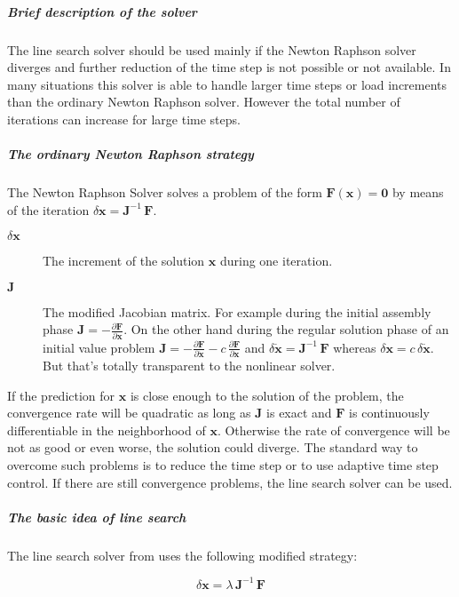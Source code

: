 \subparagraph{Brief description of the solver}
The line search solver should be used mainly if the Newton Raphson solver diverges and further reduction of the time step is not possible or not available. In many situations this solver is able to handle larger time steps or load increments than the ordinary Newton Raphson solver. However the total number of iterations can increase for large time steps.

\subparagraph{The ordinary Newton Raphson strategy}
The Newton Raphson Solver solves a problem of the form $\boldsymbol{F}\left(\boldsymbol{x}\right)=\boldsymbol{0}$ by means of the iteration $\delta\boldsymbol{x}=\boldsymbol{J}^{-1}\,\boldsymbol{F}$.

\begin{description}
\item[$\delta\boldsymbol{x}$] The increment of the solution $\boldsymbol{x}$ during one iteration.
\item[$\boldsymbol{J}$] The modified Jacobian matrix. 
For example during the initial assembly phase $\boldsymbol{J}=-\frac{\partial \boldsymbol{F}}{\partial \boldsymbol{x}}$. 
On the other hand during the regular solution phase of an initial value problem $\boldsymbol{J}=-\frac{\partial \boldsymbol{F}}{\partial \dot{\boldsymbol{x}}}-c\,\frac{\partial \boldsymbol{F}}{\partial \boldsymbol{x}}$
and $\delta\dot{\boldsymbol{x}}=\boldsymbol{J}^{-1}\,\boldsymbol{F}$ whereas $\delta\boldsymbol{x}=c\,\delta\dot{\boldsymbol{x}}$. But that's totally transparent to the nonlinear solver.
\end{description}

If the prediction for $\boldsymbol{x}$ is close enough to the solution of the problem, the convergence rate will be quadratic as long as $\boldsymbol{J}$ is exact and $\boldsymbol{F}$ is continuously differentiable in the neighborhood of $\boldsymbol{x}$. Otherwise the rate of convergence will be not as good or even worse, the solution could diverge. The standard way to overcome such problems is to reduce the time step or to use adaptive time step control. If there are still convergence problems, the line search solver can be used.

\subparagraph{The basic idea of line search}
The line search solver from \cite{NUMERICAL-RECIPES-IN-C} uses the following modified strategy:

\begin{equation}
\delta\boldsymbol{x}=\lambda\,\boldsymbol{J}^{-1}\,\boldsymbol{F}
\end{equation}

